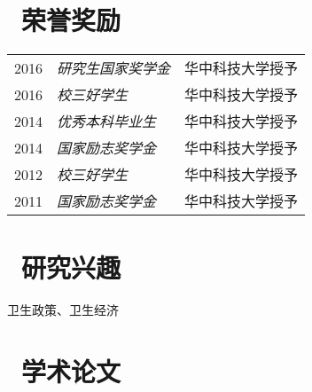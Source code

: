 \documentclass{resume}
\begin{document}
\section{\faSigning\ 荣誉奖励}
\begin{tabular}{rll}
2016 & \textit{研究生国家奖学金} & 华中科技大学授予\\
2016 & \textit{校三好学生} &  华中科技大学授予\\
2014 & 	\textit{优秀本科毕业生} & 华中科技大学授予\\
2014 & 	\textit{国家励志奖学金} &  华中科技大学授予\\
2012 & 	\textit{校三好学生} & 华中科技大学授予\\
2011 & 	\textit{国家励志奖学金} &华中科技大学授予\\
\end{tabular}

\section{\faLeanpub\ 研究兴趣}
卫生政策、卫生经济

\section{\faFileTextO\ 学术论文}
\end{document}
